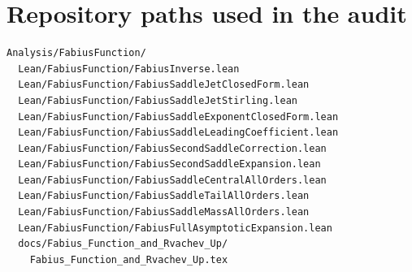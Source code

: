 \documentclass[11pt,oneside]{article}
\theoremstyle{definition}
\theoremstyle{remark}
\begin{document}
\section{Repository paths used in the audit}
\label{inverse:app:paths}

\begin{lstlisting}[style=pseudo]
Analysis/FabiusFunction/
  Lean/FabiusFunction/FabiusInverse.lean
  Lean/FabiusFunction/FabiusSaddleJetClosedForm.lean
  Lean/FabiusFunction/FabiusSaddleJetStirling.lean
  Lean/FabiusFunction/FabiusSaddleExponentClosedForm.lean
  Lean/FabiusFunction/FabiusSaddleLeadingCoefficient.lean
  Lean/FabiusFunction/FabiusSecondSaddleCorrection.lean
  Lean/FabiusFunction/FabiusSecondSaddleExpansion.lean
  Lean/FabiusFunction/FabiusSaddleCentralAllOrders.lean
  Lean/FabiusFunction/FabiusSaddleTailAllOrders.lean
  Lean/FabiusFunction/FabiusSaddleMassAllOrders.lean
  Lean/FabiusFunction/FabiusFullAsymptoticExpansion.lean
  docs/Fabius_Function_and_Rvachev_Up/
    Fabius_Function_and_Rvachev_Up.tex
\end{lstlisting}
\end{document}
